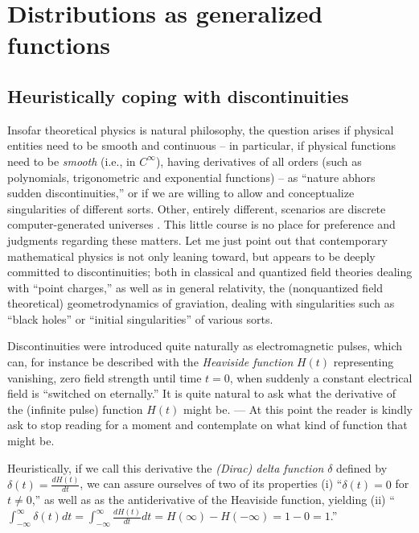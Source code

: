\chapter{Distributions as generalized functions}
\label{2011-m-ch:gf}

\section{Heuristically coping with discontinuities}

Insofar theoretical physics is natural philosophy,
the question arises if physical entities need to be smooth and continuous
--
in particular,
if physical functions need to be {\em smooth} (i.e., in $C^\infty$),
having derivatives of all orders  \cite{trench}
(such as polynomials, trigonometric and exponential functions)
--
as ``nature abhors sudden discontinuities,''
or if we are willing to allow and conceptualize singularities of different sorts.
Other, entirely different,
scenarios are discrete
\cite{zuse-94,zuse-69} computer-generated universes \cite{fredkin,toffoli:79,svozil-2005-cu}.
This little course is no place for preference and judgments regarding these matters.
Let me just point out that contemporary mathematical physics is not only leaning toward,
but appears to be deeply committed to discontinuities;
both in classical and quantized field theories dealing with
 ``point charges,''
as well as in general relativity,  the (nonquantized field theoretical)
geometrodynamics of graviation,
dealing with singularities such as ``black holes'' or ``initial singularities'' of various sorts.

Discontinuities were introduced quite naturally as electromagnetic pulses,
which can, for instance be described with the {\em Heaviside function}
$H(t)$ representing vanishing, zero field strength until time $t=0$, when suddenly a constant electrical field is
``switched on eternally.''
It is quite natural to ask what the derivative of the (infinite pulse) function $H(t)$ might be.
---
At this point the reader is kindly ask to stop reading for a moment and contemplate
on what kind of function that might be.

Heuristically, if we call this derivative the {\em (Dirac) delta function} $\delta$ defined by
$\delta (t)= \frac{d H(t)}{dt}$,
we can assure ourselves of two of its properties
(i) ``$\delta (t) =0$ for $t\neq 0$,''
as well as as the antiderivative of the Heaviside function, yielding
(ii) ``$\int_{-\infty}^\infty \delta (t) dt  = \int_{-\infty}^\infty \frac{d H(t)}{dt} dt  =
H(\infty ) - H(-\infty ) = 1-0=1$.''

